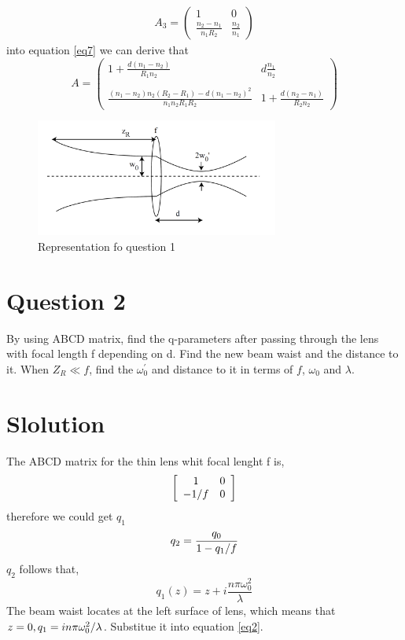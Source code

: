 \documentclass{article}
\begin{document}
$$
\begin{array}{l}
A_3=
\left(
\begin{array}{cc}
1 & 0\\
\frac{n_2-n_1}{n_1R_2} & \frac{n_2}{n_1}
\end{array}
\right)
\end{array}
$$
into equation \ref{eq7} we can derive that
\begin{equation}\label{key}
A=\left(
\begin{array}{cc}
1+\frac{d(n_1-n_2)}{R_1n_2} & d\frac{n_1}{n_2} \\
\\
\frac{(n_1-n_2)n_2(R_2-R_1)-d(n_1-n_2)^2}{n_1n_2R_1R_2}& 1+\frac{d(n_2-n_1)}{R_2n_2}
\end{array}
\right)
\end{equation}
\begin{figure}[h]
	\centering
	\includegraphics[width=8cm]{question1.png}
	\caption{Representation fo question 1}
	\label{fig2}
\end{figure}

\section{Question 2} %
By using ABCD matrix, find the q-parameters after passing through the lens with focal length f depending on d. Find the new beam waist  and the distance to it. When $Z_R\ll f$, find the $ \omega_{0}^{'} $ and distance to it in terms of $f$, $\omega_0$ and $\lambda$.


\section*{Slolution}
The ABCD matrix for the thin lens whit focal lenght f is,
\begin{equation}\label{eq10}
\left[
\begin{array}{cc}
1 & 0 \\
-1\//f & 0 \\
\end{array}
\right]
\end{equation}
therefore we could get $q_1$
\begin{equation}\label{eq8}
q_2=\dfrac{q_0}{1-q_1\//f}
\end{equation}
$ q_2 $ follows that,
\begin{equation}\label{eq9}
q_1(z)=z+i\dfrac{n\pi\omega_{0}^{2}}{\lambda}
\end{equation}
The beam  waist locates at the left surface of lens, which means that $z=0, q_1=in\pi\omega_{0}^{2}\//\lambda$. Substitue it into equation \ref{eq2}.
\end{document}
